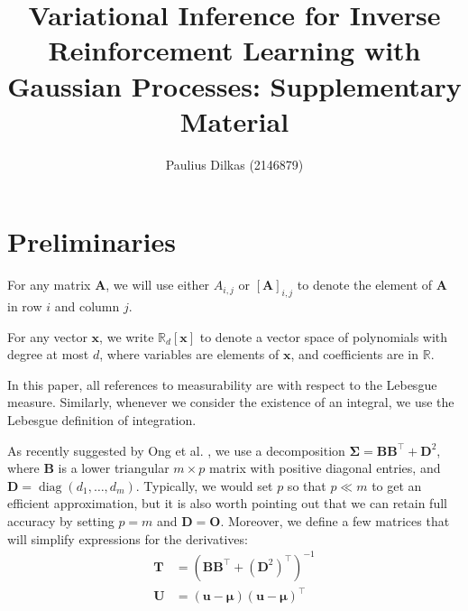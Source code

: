 \documentclass{article}
\title{Variational Inference for Inverse Reinforcement Learning with Gaussian
  Processes: Supplementary Material}
\author{Paulius Dilkas (2146879)}
\theoremstyle{definition}
\theoremstyle{remark}
\DeclareMathOperator{\diag}{diag}
\begin{document}
\maketitle

\section{Preliminaries}

For any matrix $\mathbf{A}$, we will use either $A_{i,j}$ or
$[\mathbf{A}]_{i,j}$ to denote the element of $\mathbf{A}$ in row $i$ and column
$j$.

For any vector $\mathbf{x}$, we write $\mathbb{R}_d[\mathbf{x}]$ to denote a
vector space of polynomials with degree at most $d$, where variables are
elements of $\mathbf{x}$, and coefficients are in $\mathbb{R}$.

In this paper, all references to measurability are with respect to the Lebesgue
measure. Similarly, whenever we consider the existence of an integral, we use
the Lebesgue definition of integration.

As recently suggested by Ong et al. \cite{ong2018gaussian}, we use a
decomposition $\bm\Sigma = \mathbf{B}\mathbf{B}^\intercal + \mathbf{D}^2$, where
$\mathbf{B}$ is a lower triangular $m \times p$ matrix with positive diagonal
entries, and $\mathbf{D} = \diag(d_1, \dots, d_m)$. Typically, we would set $p$
so that $p \ll m$ to get an efficient approximation, but it is also worth
pointing out that we can retain full accuracy by setting $p = m$ and $\mathbf{D}
= \mathbf{O}$. Moreover, we define a few matrices that will simplify expressions
for the derivatives:
\begin{align*}
  \mathbf{T} &= (\mathbf{B}\mathbf{B}^\intercal + (\mathbf{D}^2)^\intercal)^{-1} \\
  \mathbf{U} &= (\mathbf{u} - \bm\mu)(\mathbf{u} - \bm\mu)^\intercal
\end{align*}
\end{document}
